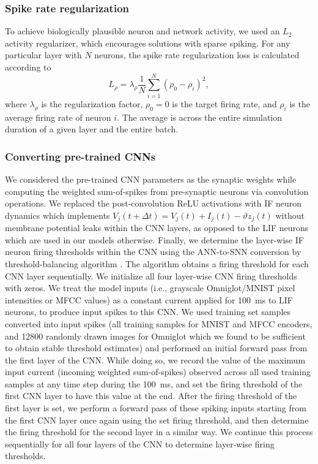 \documentclass{article}
\begin{document}
\subsubsection*{Spike rate regularization}
\label{sec:supp-rate_regularization}
To achieve biologically plausible neuron and network activity, we used an
$L_2$ activity regularizer, which encourages solutions with sparse spiking. For any particular layer with $N$ neurons, the spike rate regularization loss is calculated according to
\begin{equation}
    L_{\rho} = \lambda_{\rho} \frac{1}{N}\sum_{i=1}^N (\rho_0 - \rho_i)^2,
\label{eq:supp-rate_regularization}
\end{equation}
where $\lambda_{\rho}$ is the regularization factor, $\rho_0 = 0$ is the target firing rate, and $\rho_i$ is the average firing rate of neuron $i$. The average is across the entire simulation duration of a given layer and the entire batch.

\subsubsection*{Converting pre-trained CNNs}
\label{sec:supp-cnn_conversion}
We considered the pre-trained \gls{CNN} parameters as the synaptic weights while computing the weighted sum-of-spikes from pre-synaptic neurons via convolution operations. We replaced the post-convolution ReLU activations with \gls{IF} neuron dynamics which implements $V_j(t + \Delta t) = V_j(t) + I_j(t) - \vartheta z_j(t)$ without membrane potential leaks within the \gls{CNN} layers, as opposed to the \gls{LIF} neurons which are used in our models otherwise. Finally, we determine the layer-wise \gls{IF} neuron firing thresholds within the \gls{CNN} using the ANN-to-SNN conversion by threshold-balancing algorithm \cite{diehl2015fast,sengupta2019going}. The algorithm obtains a firing threshold for each \gls{CNN} layer sequentially. We initialize all four layer-wise \gls{CNN} firing thresholds with zeros. We treat the model inputs (i.e., grayscale Omniglot/MNIST pixel intensities or \gls{MFCC} values) as a constant current applied for \SI{100}{\ms} to \gls{LIF} neurons, to produce input spikes to this \gls{CNN}. We used training set samples converted into input spikes (all training samples for MNIST and \gls{MFCC} encoders, and \num{12800} randomly drawn images for Omniglot which we found to be sufficient to obtain stable threshold estimates) and performed an initial forward pass from the first layer of the \gls{CNN}. While doing so, we record the value of the maximum input current (incoming weighted sum-of-spikes) observed across all used training samples at any time step during the \SI{100}{\ms}, and set the firing threshold of the first \gls{CNN} layer to have this value at the end. After the firing threshold of the first layer is set, we perform a forward pass of these spiking inputs starting from the first \gls{CNN} layer once again using the set firing threshold, and then determine the firing threshold for the second layer in a similar way. We continue this process sequentially for all four layers of the \gls{CNN} to determine layer-wise firing thresholds.
\end{document}
